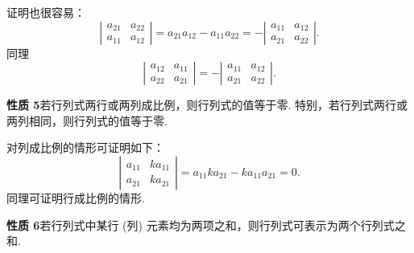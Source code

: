 \documentclass[UTF8,12pt,a4paper,fontset=fandol]{ctexart}
\begin{document}
证明也很容易：
\[
\left|\begin{array}{cc}
a_{21} & a_{22}\\
a_{11} & a_{12}
\end{array}\right|
=a_{21}a_{12}-a_{11}a_{22}
=-\left|\begin{array}{cc}
a_{11} & a_{12}\\
a_{21} & a_{22}
\end{array}\right|.
\]
同理
\[
\left|\begin{array}{cc}
a_{12} & a_{11}\\
a_{22} & a_{21}
\end{array}\right|
=-\left|\begin{array}{cc}
a_{11} & a_{12}\\
a_{21} & a_{22}
\end{array}\right|.
\]

\noindent\textbf{性质 5}\quad 若行列式两行或两列成比例，则行列式的值等于零. 特别，若行列式两行或两列相同，则行列式的值等于零.

对列成比例的情形可证明如下：
\[
\left|\begin{array}{cc}
a_{11} & ka_{11}\\
a_{21} & ka_{21}
\end{array}\right|
=a_{11}ka_{21}-ka_{11}a_{21}=0.
\]
同理可证明行成比例的情形.

\noindent\textbf{性质 6}\quad 若行列式中某行 (列) 元素均为两项之和，则行列式可表示为两个行列式之和.
\end{document}
